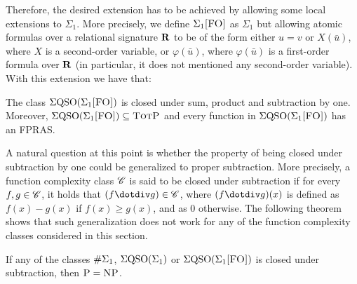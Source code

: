 Therefore, the desired extension has to be achieved by allowing some local extensions to $\Sigma_1$. More precisely, we define $\Sigma_{1}\textsc{[FO]}$ as $\Sigma_1$ but allowing atomic formulas over a relational signature $\mathbf{R}$ to be of the form either $u = v$ or $X(\bar u)$, where $X$ is a second-order variable, or $\varphi(\bar u)$, where $\varphi(\bar u)$ is a first-order formula over $\mathbf{R}$ (in particular, it does not mentioned any second-order variable). With this extension we have that:
\begin{theorem}\label{sigmafo-minusone}
The class $\Sigma{\rm QSO}(\Sigma_{1}\textsc{[FO]})$ is closed under sum, product and subtraction by one. Moreover, $\Sigma{\rm QSO}(\Sigma_{1}\textsc{[FO]}) \subseteq \text{\sc TotP}$ and every function in $\Sigma{\rm QSO}(\Sigma_{1}\textsc{[FO]})$ has an FPRAS.
\end{theorem}

A natural question at this point is whether the property of being closed under subtraction by one could be generalized to proper subtraction. More precisely, a function complexity class $\mathscr{C}$ is said to be closed under subtraction if for every $f,g \in \mathscr{C}$, it holds that $(f \dotdiv g) \in \CC$, where $(f \dotdiv g)(x)$ is defined as $f(x) - g(x)$ if $f(x) \geq g(x)$, and as $0$ otherwise. The following theorem shows that such generalization does not work for any of the function complexity classes considered in this section.
\begin{theorem} \label{sub-pnp}
If any of the classes $\#\Sigma_{1}$, $\Sigma{\rm QSO}(\Sigma_{1})$ or $\Sigma{\rm QSO}(\Sigma_{1}\textsc{[FO]})$ is closed under subtraction, then $\text{\sc P} = \text{\sc NP}$.
\end{theorem}



%


